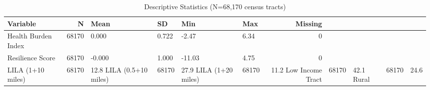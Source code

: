 \begin{table}
\caption{Descriptive Statistics (N=68,170 census tracts)}
\begin{tabular}{lrllllr}
\toprule
Variable & N & Mean & SD & Min & Max & Missing \\
\midrule
Health Burden Index & 68170 & 0.000 & 0.722 & -2.47 & 6.34 & 0 \\
Resilience Score & 68170 & -0.000 & 1.000 & -11.03 & 4.75 & 0 \\
LILA (1+10 miles) & 68170 & 12.8%
LILA (0.5+10 miles) & 68170 & 27.9%
LILA (1+20 miles) & 68170 & 11.2%
Low Income Tract & 68170 & 42.1%
Rural & 68170 & 24.6%
\bottomrule
\end{tabular}
\end{table}
